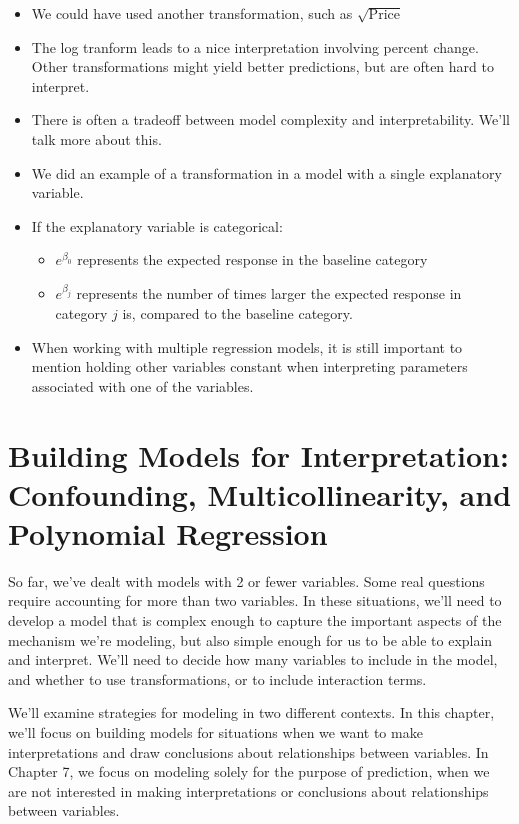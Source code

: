 \documentclass[
  letterpaper,
  DIV=11,
  numbers=noendperiod]{scrreprt}
\providecommand{\tightlist}{%
  \setlength{\itemsep}{0pt}\setlength{\parskip}{0pt}}\usepackage{longtable,booktabs,array}
\begin{document}
\begin{itemize}
\item
  We could have used another transformation, such as
  \(\sqrt{\text{Price}}\)
\item
  The log tranform leads to a nice interpretation involving percent
  change. Other transformations might yield better predictions, but are
  often hard to interpret.
\item
  There is often a tradeoff between model complexity and
  interpretability. We'll talk more about this.
\item
  We did an example of a transformation in a model with a single
  explanatory variable.
\item
  If the explanatory variable is categorical:\\

  \begin{itemize}
  \tightlist
  \item
    \(e^{\beta_0}\) represents the expected response in the baseline
    category\\
  \item
    \(e^{\beta_j}\) represents the number of times larger the expected
    response in category \(j\) is, compared to the baseline category.
  \end{itemize}
\item
  When working with multiple regression models, it is still important to
  mention holding other variables constant when interpreting parameters
  associated with one of the variables.
\end{itemize}

\section{Building Models for Interpretation: Confounding,
Multicollinearity, and Polynomial
Regression}\label{building-models-for-interpretation-confounding-multicollinearity-and-polynomial-regression}

So far, we've dealt with models with 2 or fewer variables. Some real
questions require accounting for more than two variables. In these
situations, we'll need to develop a model that is complex enough to
capture the important aspects of the mechanism we're modeling, but also
simple enough for us to be able to explain and interpret. We'll need to
decide how many variables to include in the model, and whether to use
transformations, or to include interaction terms.

We'll examine strategies for modeling in two different contexts. In this
chapter, we'll focus on building models for situations when we want to
make interpretations and draw conclusions about relationships between
variables. In Chapter 7, we focus on modeling solely for the purpose of
prediction, when we are not interested in making interpretations or
conclusions about relationships between variables.
\end{document}
